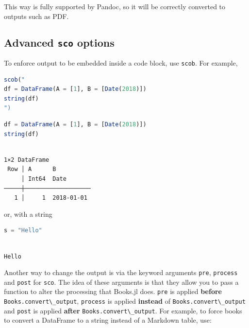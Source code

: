 \documentclass[
  notoc %
]{tufte-book}
\newcommand{\passthrough}[1]{#1}
\begin{document}
This way is fully supported by Pandoc, so it will be correctly converted
to outputs such as PDF.

\hypertarget{advanced-sco-options}{%
\subsection{\texorpdfstring{Advanced \texttt{sco}
options}{Advanced sco options}}\label{advanced-sco-options}}

To enforce output to be embedded inside a code block, use
\passthrough{\lstinline!scob!}. For example,

\begin{lstlisting}[language=Julia]
scob("
df = DataFrame(A = [1], B = [Date(2018)])
string(df)
")
\end{lstlisting}

\begin{lstlisting}[language=Julia]
df = DataFrame(A = [1], B = [Date(2018)])
string(df)
\end{lstlisting}

\begin{lstlisting}[language=Output]

1×2 DataFrame
 Row │ A      B
     │ Int64  Date
─────┼───────────────────
   1 │     1  2018-01-01

\end{lstlisting}

or, with a string

\begin{lstlisting}[language=Julia]
s = "Hello"
\end{lstlisting}

\begin{lstlisting}[language=Output]

Hello

\end{lstlisting}

Another way to change the output is via the keyword arguments
\passthrough{\lstinline!pre!}, \passthrough{\lstinline!process!} and
\passthrough{\lstinline!post!} for \passthrough{\lstinline!sco!}. The
idea of these arguments is that they allow you to pass a function to
alter the processing that Books.jl does. \passthrough{\lstinline!pre!}
is applied \textbf{before}
\passthrough{\lstinline!Books.convert\_output!},
\passthrough{\lstinline!process!} is applied \textbf{instead} of
\passthrough{\lstinline!Books.convert\_output!} and
\passthrough{\lstinline!post!} is applied \textbf{after}
\passthrough{\lstinline!Books.convert\_output!}. For example, to force
books to convert a DataFrame to a string instead of a Markdown table,
use:
\end{document}
